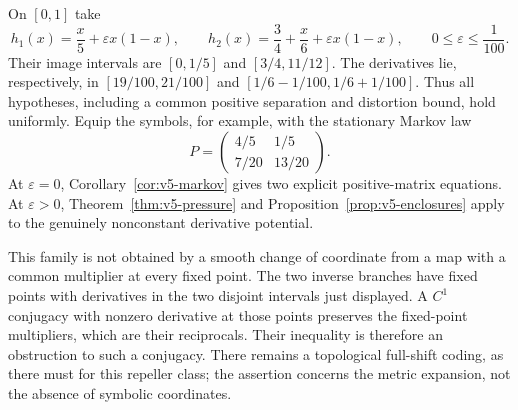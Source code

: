 \begin{example}\label{ex:v5-variable}
On $[0,1]$ take
\[
 h_1(x)=\frac{x}{5}+\varepsilon x(1-x),\qquad
 h_2(x)=\frac34+\frac{x}{6}+\varepsilon x(1-x),
 \qquad 0\le\varepsilon\le\frac1{100}.
\]
Their image intervals are $[0,1/5]$ and $[3/4,11/12]$.
The derivatives lie, respectively, in $[19/100,21/100]$ and
$[1/6-1/100,1/6+1/100]$. Thus all hypotheses, including a common
positive separation and distortion bound, hold uniformly. Equip
the symbols, for example, with the stationary Markov law
\[
 P=\begin{pmatrix}4/5&1/5\\7/20&13/20\end{pmatrix}.
\]
At $\varepsilon=0$, Corollary~\ref{cor:v5-markov} gives two
explicit positive-matrix equations. At $\varepsilon>0$,
Theorem~\ref{thm:v5-pressure} and
Proposition~\ref{prop:v5-enclosures} apply to the genuinely
nonconstant derivative potential.

This family is not obtained by a smooth change of coordinate
from a map with a common multiplier at every fixed point.
The two inverse branches have fixed points with derivatives in
the two disjoint intervals just displayed. A $C^1$ conjugacy
with nonzero derivative at those points preserves the fixed-point
multipliers, which are their reciprocals. Their inequality is
therefore an obstruction to such a conjugacy. There remains a
topological full-shift coding, as there must for this repeller
class; the assertion concerns the metric expansion, not the
absence of symbolic coordinates.
\end{example}
